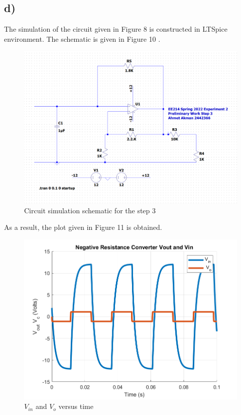 \documentclass[letterpaper,12pt]{article}
\begin{document}
\subsection{d)}
The simulation of the circuit given in Figure 8 is constructed in LTSpice environment. The schematic is given in Figure 10 .
\begin{figure}[H]
    \centering
    \includegraphics[width=1\textwidth]{3Sim.png}
\caption{Circuit simulation schematic  for the step 3}
\end{figure} 
As a result, the plot given in Figure 11 is obtained.
\begin{figure}[H]
    \centering
    \includegraphics[width=1\textwidth]{3.png}
\caption{\(V_{in}\) and \(V_o\) versus time} 
\end{figure} 
\end{document}
